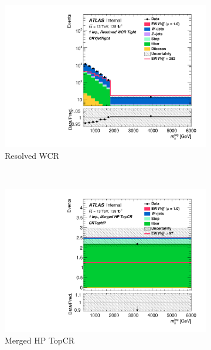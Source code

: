 \begin{figure}[ht]
\begin{subfigure}[b]{0.32\textwidth}
        \includegraphics[width=\textwidth]{figures/FitResults/prefit/Region_disttagMjj_DCRVjetTight_BMin0_T0_Y6051_incTag1_J2_L1_incJet1_Prefitlog.pdf}
        \caption{Resolved WCR}
    \end{subfigure}
    \\
    \begin{subfigure}[b]{0.32\textwidth}
        \includegraphics[width=\textwidth]{figures/FitResults/prefit/Region_disttagMjj_DCRTopHP_BMin0_J0_incJet1_L1_T0_incFat1_Y6051_incTag1_Fat1_Prefit.pdf}
        \caption{Merged HP TopCR}
    \end{subfigure}
    \begin{subfigure}[b]{0.32\textwidth}

\end{subfigure}
\end{figure}
